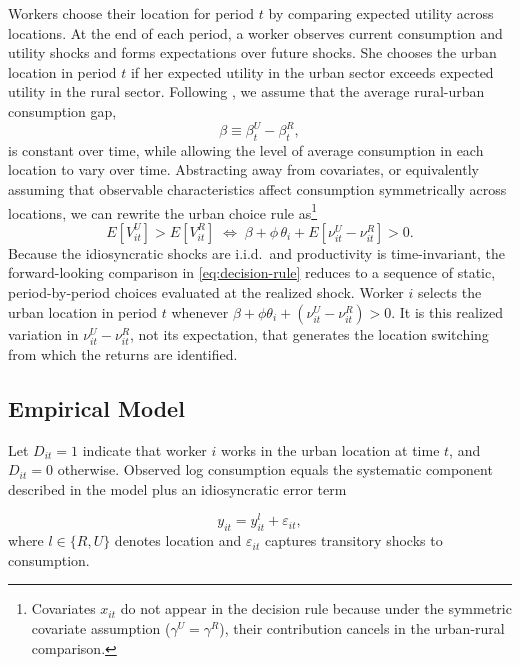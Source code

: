 Workers choose their location for period $t$ by comparing expected utility across locations. 
At the end of each period, a worker observes current consumption and utility shocks and forms expectations over future shocks. 
She chooses the urban location in period $t$ if her expected utility in the urban sector exceeds expected utility in the rural sector. 
Following \cite{lemieuxEstimatingEffectsUnions1998}, we assume that the average rural-urban consumption gap,
\begin{equation}
    \beta \equiv \beta_t^U - \beta_t^R,\label{eq:beta}
\end{equation}
is constant over time, while allowing the level of average consumption in each location to vary over time.
Abstracting away from covariates, or equivalently assuming that observable characteristics affect consumption symmetrically across locations, we can rewrite the urban choice rule as\footnote{Covariates $x_{it}$ do not appear in the decision rule because under the symmetric covariate assumption ($\gamma^U = \gamma^R$), their contribution cancels in the urban-rural comparison.} 
\begin{equation}\label{eq:decision-rule}
    E\!\left[V_{it}^U\right] > E\!\left[V_{it}^R\right]
    \;\Longleftrightarrow\;
    \beta + \phi\,\theta_i + E\!\left[\nu_{it}^U - \nu_{it}^R\right] > 0.
\end{equation}
Because the idiosyncratic shocks are i.i.d.\ and productivity is time-invariant, the forward-looking comparison in \eqref{eq:decision-rule} reduces to a sequence of static, period-by-period choices evaluated at the realized shock.
Worker $i$ selects the urban location in period $t$ whenever $\beta + \phi\theta_i + (\nu_{it}^U - \nu_{it}^R) > 0$.
It is this realized variation in $\nu_{it}^U - \nu_{it}^R$, not its expectation, that generates the location switching from which the returns are identified.

\subsection{Empirical Model}\label{subsec:empirical-model}

Let $D_{i t}=1$ indicate that worker $i$ works in the urban location at time $t$, and $D_{i t}=0$ otherwise.
Observed log consumption equals the systematic component described in the model plus an idiosyncratic error term

\begin{equation}
    y_{i t} = y_{i t}^l + \varepsilon_{i t},
\end{equation}
where $l \in \{R,U\}$ denotes location and $\varepsilon_{i t}$ captures transitory shocks to consumption.

